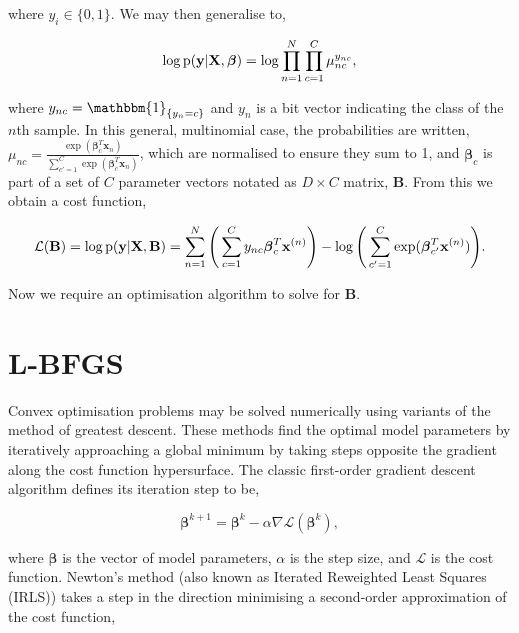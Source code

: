 where $y_i \in \{0, 1\}$. We may then generalise to,

\begin{equation}
\begin{aligned}
\log\text{p}(\mathbf{y}|\mathbf{X}, \boldsymbol\beta) = \log \prod_{n = 1}^N \prod_{c = 1}^C \mu_{nc}^{y_{nc}},
\end{aligned}
\label{eq:multinomial}
\end{equation}

where $y_{nc} = \mathbbm{1}_{\{y_n = c\}}$ and $y_n$ is a bit vector indicating the class of the $n$th sample. In this general, multinomial case, the probabilities are written, $\mu_{nc} = \frac{\exp(\boldsymbol\beta_c^T\mathbf{x}_n)}{\sum_{c' = 1}^C \exp(\boldsymbol\beta_c^T\mathbf{x}_n)}$, which are normalised to ensure they sum to 1, and $\boldsymbol\beta_c$ is part of a set of $C$ parameter vectors notated as $D \times C$ matrix, $\mathbf{B}$. From this we obtain a cost function,

\begin{equation}
\mathcal{L}(\mathbf{B}) = 
\log\text{p}(\mathbf{y}|\mathbf{X}, \mathbf{B}) = \sum_{n=1}^N  \Bigg( \sum_{c = 1}^C y_{nc}\boldsymbol\beta_c^T \mathbf{x}^{(n)} \Bigg) - \log \Bigg( \sum_{c' = 1}^C \exp(\boldsymbol\beta_{c'}^T\mathbf{x}^{(n)})\Bigg).
\label{eq:logisticcost}
\end{equation}

Now we require an optimisation algorithm to solve for $\mathbf{B}$.

\section{L-BFGS}
\label{sec:lbfgs}

Convex optimisation problems may be solved numerically using variants of the method of greatest descent. These methods find the optimal model parameters by iteratively approaching a global minimum by taking steps opposite the gradient along the cost function hypersurface. The classic first-order gradient descent algorithm defines its iteration step to be,

\begin{equation}
\boldsymbol\beta^{k+1} = \boldsymbol\beta^{k} - \alpha\nabla\mathcal{L}(\boldsymbol\beta^{k}),
\label{eq:gd}
\end{equation}

where $\boldsymbol\beta$ is the vector of model parameters, $\alpha$ is the step size, and $\mathcal{L}$ is the cost function. Newton's method (also known as Iterated Reweighted Least Squares (IRLS)) takes a step in the direction minimising a second-order approximation of the cost function,

